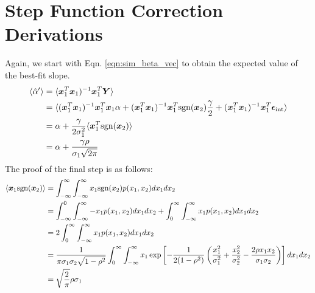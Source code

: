 \section{Step Function Correction Derivations}
\label{app:step_func}
Again, we start with Eqn. \ref{eqn:sim_beta_vec} to obtain the expected value of the best-fit slope.
\begin{align*}
    \langle\hat{\alpha}^\prime\rangle &= \langle \bm{x}_1^T\bm{x}_1)^{-1}\bm{x}_1^T\bm{Y}\rangle \\
    &= \langle(\bm{x}_1^T\bm{x}_1)^{-1}\bm{x}_1^T\bm{x}_1\alpha + (\bm{x}_1^T\bm{x}_1)^{-1}\bm{x}_1^T\text{sgn}(\bm{x}_2)\frac{\gamma}{2}+(\bm{x}_1^T\bm{x}_1)^{-1}\bm{x}_1^T\bm{\epsilon}_\text{int}\rangle\\
    &= \alpha + \frac{\gamma}{2\sigma_1^2}\langle\bm{x}_1^T\text{sgn}(\bm{x}_2)\rangle \\
    &= \alpha + \frac{\gamma\rho}{\sigma_1\sqrt{2\pi}}
\end{align*}
The proof of the final step is as follows:
\begin{align}
\label{eqn:exp_val_abs_val}
    \langle \bm{x}_1\text{sgn}(\bm{x}_2)\rangle &= \displaystyle\int_{-\infty}^\infty \displaystyle\int_{-\infty}^\infty x_1\text{sgn}(x_2)p(x_1, x_2)dx_1dx_2\nonumber\\
    &= \displaystyle\int_{-\infty}^0 \displaystyle\int_{-\infty}^\infty -x_1 p(x_1, x_2)dx_1dx_2+
    \displaystyle\int_{0}^\infty \displaystyle\int_{-\infty}^\infty x_1 p(x_1, x_2)dx_1dx_2\nonumber\\
    &= 2 \displaystyle\int_{0}^\infty \displaystyle\int_{-\infty}^\infty x_1 p(x_1, x_2)dx_1dx_2\nonumber\\
    &= \frac{1}{\pi\sigma_1\sigma_2\sqrt{1-\rho^2}}\displaystyle\int_{0}^\infty \displaystyle\int_{-\infty}^\infty x_1 \exp\left[-\frac{1}{2(1-\rho^2)}\left(\frac{x_1^2}{\sigma_1^2}+\frac{x_2^2}{\sigma_2^2}-\frac{2\rho x_1 x_2}{\sigma_1\sigma_2}\right)\right]dx_1dx_2\nonumber\\
    &= \sqrt\frac{2}{\pi}\rho\sigma_1
\end{align}

